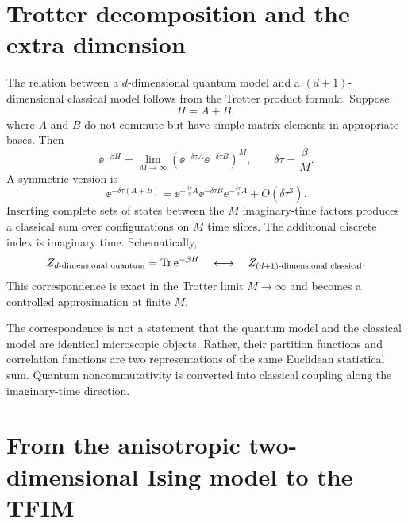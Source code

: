 \section{Trotter decomposition and the extra dimension}
\label{sec:trotter-extra-dimension}

The relation between a $d$-dimensional quantum model and a $(d+1)$-dimensional
classical model follows from the Trotter product formula. Suppose
\begin{equation}
\label{eq:hamiltonian-split-A-B}
    H=A+B,
\end{equation}
where $A$ and $B$ do not commute but have simple matrix elements in appropriate
bases. Then
\begin{equation}
\label{eq:trotter-first-order}
    \ee^{-\beta H}
    =
    \lim_{M\to\infty}
    \left(
        \ee^{-\delta\tau A}\ee^{-\delta\tau B}
    \right)^M,
    \qquad
    \delta\tau=\frac{\beta}{M}.
\end{equation}
A symmetric version is
\begin{equation}
\label{eq:trotter-symmetric}
    \ee^{-\delta\tau(A+B)}
    =
    \ee^{-\frac{\delta\tau}{2}A}
    \ee^{-\delta\tau B}
    \ee^{-\frac{\delta\tau}{2}A}
    +O(\delta\tau^3).
\end{equation}
Inserting complete sets of states between the $M$ imaginary-time factors produces
a classical sum over configurations on $M$ time slices. The additional discrete
index is imaginary time. Schematically,
\begin{equation}
\label{eq:quantum-classical-schematic}
    Z_{d\text{-dimensional quantum}}
    =
    \operatorname{Tr}\mathrm{e}^{-\beta H}
    \quad\longleftrightarrow\quad
    Z_{(d+1)\text{-dimensional classical}} .
\end{equation}
This correspondence is exact in the Trotter limit $M\to\infty$ and becomes a
controlled approximation at finite $M$.

The correspondence is not a statement that the quantum model and the classical
model are identical microscopic objects. Rather, their partition functions and
correlation functions are two representations of the same Euclidean statistical
sum. Quantum noncommutativity is converted into classical coupling along the
imaginary-time direction.

\section{From the anisotropic two-dimensional Ising model to the TFIM}
\label{sec:anisotropic-ising-to-tfim-transfer}

